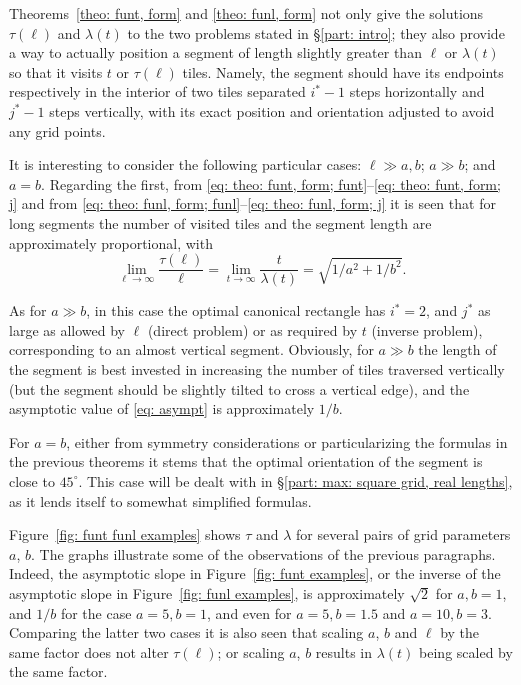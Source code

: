 \documentclass[12pt, a4paper]{article}
\newcommand{\funt}{\tau} %
\newcommand{\funl}{\lambda} %
\newcommand{\len}{\ell} %
\newcommand{\tiles}{t} %
\newcommand{\isoli}{i^\ast}
\newcommand{\jsoli}{j^\ast}
\newcommand{\touches}{visits}
\newcommand{\touched}{visited}
\begin{document}
Theorems~\ref{theo: funt, form} and \ref{theo: funl, form} not only give the solutions $\funt(\len)$ and $\funl(\tiles)$ to the two problems stated in \S\ref{part: intro}; they also provide a way to actually position a segment of length slightly greater than $\len$ or $\funl(\tiles)$ so that it \touches{} $\tiles$ or $\funt(\len)$ tiles. Namely, the segment should have its endpoints respectively in the interior of two tiles separated $\isoli-1$ steps horizontally and $\jsoli-1$ steps vertically, with its exact position and orientation  adjusted to avoid any grid points.

It is interesting to consider the following particular cases: $\len \gg a,b$; $a \gg b$; and $a=b$. Regarding the first, from \eqref{eq: theo: funt, form; funt}--\eqref{eq: theo: funt, form; j}
and from \eqref{eq: theo: funl, form; funl}--\eqref{eq: theo: funl, form; j}
it is seen that for long segments the number of \touched{} tiles and the segment length are approximately proportional, with
\begin{equation}
\label{eq: asympt}
\lim_{\len \rightarrow \infty} \frac{\funt(\len)}{\len}
= \lim_{\tiles \rightarrow \infty} \frac{\tiles}{\funl(\tiles)}
= \sqrt{1/a^2 + 1/b^2}.
\end{equation}

As for $a \gg b$, in this case the optimal canonical rectangle has $\isoli = 2$, and $\jsoli$ as large as allowed by $\len$ (direct problem) or as required by $\tiles$ (inverse problem), corresponding to an almost vertical segment. Obviously, for $a \gg b$ the length of the segment is best invested in increasing the number of tiles traversed vertically (but the segment should be slightly tilted to cross a vertical edge), and the asymptotic value of \eqref{eq: asympt} is approximately $1/b$.

For $a=b$, either from symmetry considerations or particularizing the formulas in the previous theorems it stems that the optimal orientation of the segment is close to $45^\circ$. This case will be dealt with in \S\ref{part: max: square grid, real lengths}, as it lends itself to somewhat simplified formulas.

Figure~\ref{fig: funt funl examples} shows $\funt$ and $\funl$ for several pairs of grid parameters $a$, $b$. The graphs illustrate some of the observations of the previous paragraphs. Indeed, the asymptotic slope in Figure~\ref{fig: funt examples}, or the inverse of the asymptotic slope in Figure~\ref{fig: funl examples}, is approximately $\sqrt{2}$ for $a, b=1$, and $1/b$ for the case $a=5,b=1$, and even for $a=5,b=1.5$ and $a=10,b=3$. Comparing the latter two cases it is also seen that scaling $a$, $b$ and $\len$ by the same factor does not alter $\funt(\len)$; or scaling $a$, $b$ results in $\funl(\tiles)$ being scaled by the same factor.
\end{document}
